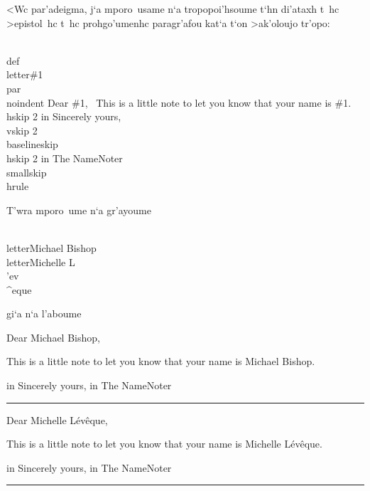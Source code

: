 <Wc par'adeigma, j`a mporo~usame n`a tropopoi'hsoume t`hn di'ataxh t~hc
>epistol~hc t~hc prohgo'umenhc paragr'afou kat`a t`on >ak'oloujo tr'opo:

\beginuser
\\def\\letter\#1\lb
\\par \\noindent
Dear \#1,
\
This is a little note to let you know that your name is \#1.
\
\\hskip 2 in Sincerely yours,
\\vskip 2\\baselineskip
\\hskip 2 in The NameNoter
\\smallskip \\hrule
\rb
\enduser

\def\letter#1{%
{\rm
\par \noindent
Dear #1,

This is a little note to let you know that your name is #1.

\hskip 2 in Sincerely yours,
\vskip 2\baselineskip
\hskip 2 in The NameNoter
\smallskip \hrule
}
}

\noindent T'wra mporo~ume n`a gr'ayoume

\beginuser
\\letter\lb Michael Bishop\rb
\\letter\lb Michelle L\\'ev\\\^{}eque\rb
\enduser

\noindent gi`a n`a l'aboume \medskip

\letter{Michael Bishop}
\goodbreak
\letter{Michelle L\'ev\^eque}


